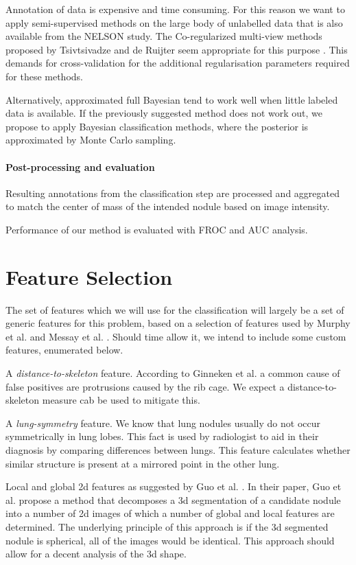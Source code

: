 \documentclass[a4paper, 10pt, english, onecolumn]{article}
\newenvironment{packed_enum}{
\begin{enumerate}
  \setlength{\itemsep}{1pt}
  \setlength{\parskip}{0pt}
  \setlength{\parsep}{0pt}
}{\end{enumerate}}
\begin{document}
Annotation of data is expensive and time consuming.
For this reason we want to apply semi-supervised methods on the large body of unlabelled data that is also available from the NELSON study.
The Co-regularized multi-view methods proposed by Tsivtsivadze and de Ruijter seem appropriate for this purpose \cite{ruijter2012online}.
This demands for cross-validation for the additional regularisation parameters required for these methods.

Alternatively, approximated full Bayesian tend to work well when little labeled data is available.
If the previously suggested method does not work out, we propose to apply Bayesian classification methods, where the posterior is approximated by Monte Carlo sampling.

\paragraph{Post-processing and evaluation}
Resulting annotations from the classification step are processed and aggregated to match the center of mass of the intended nodule based on image intensity.

Performance of our method is evaluated with FROC and AUC analysis.

\section{Feature Selection}
The set of features which we will use for the classification will largely be a set of generic features for this problem, based on a selection of features used by Murphy et al. \cite{murphy2009large} and Messay et al. \cite{messay2010new}.
Should time allow it, we intend to include some custom features, enumerated below.

\begin{packed_enum}
\item A \emph{distance-to-skeleton} feature. According to Ginneken et al. \cite{ginneken2010comparing} a common cause of false positives are protrusions caused by the rib cage. We expect a distance-to-skeleton measure cab be used to mitigate this.
\item A \emph{lung-symmetry} feature. We know that lung nodules usually do not occur symmetrically in lung lobes. This fact is used by radiologist to aid in their diagnosis by comparing differences between lungs. This feature calculates whether similar structure is present at a mirrored point in the other lung.
\item Local and global 2d features as suggested by Guo et al. \cite{guo2012high}. In their paper, Guo et al. propose a method that decomposes a 3d segmentation of a candidate nodule into a number of 2d images of which a number of global and local features are determined. The underlying principle of this approach is if the 3d segmented nodule is spherical, all of the images would be identical. This approach should allow for a decent analysis of the 3d shape.
\end{packed_enum}
\end{document}
